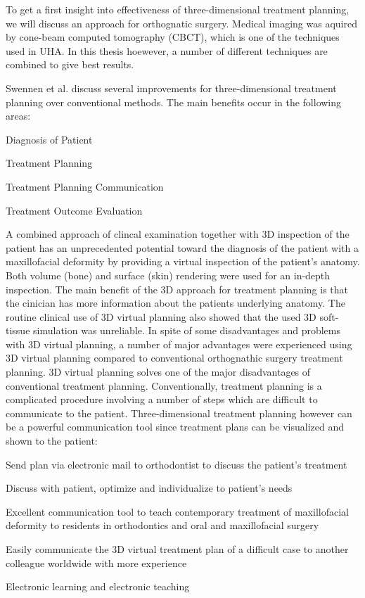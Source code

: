 To get a first insight into effectiveness of three-dimensional treatment planning, we will discuss an approach for orthognatic surgery.
Medical imaging was aquired by cone-beam computed tomography (CBCT), which is one of the techniques used in UHA.
In this thesis hoewever, a number of different techniques are combined to give best results.

Swennen et al. discuss several improvements for three-dimensional treatment planning over conventional methods.
The main benefits occur in the following areas:

\begin{compactenum}[label=(\alph*)]
    \item Diagnosis of Patient
    \item Treatment Planning
    \item Treatment Planning Communication
    \item Treatment Outcome Evaluation
\end{compactenum}

A combined approach of clincal examination together with 3D inspection of the patient has an unprecedented potential toward the diagnosis of the patient with a maxillofacial deformity \cite{swennen2009three} by providing a virtual inspection of the patient’s anatomy.
Both volume (bone) and surface (skin) rendering were used for an in-depth inspection.
The main benefit of the 3D approach for treatment planning is that the cinician has more information about the patients underlying anatomy.
The routine clinical use of 3D virtual planning also showed that the used 3D soft-tissue simulation was unreliable.
In spite of some disadvantages and problems with 3D virtual planning, a number of major advantages were experienced using 3D virtual planning compared to conventional orthognathic surgery treatment planning.
3D virtual planning solves one of the major disadvantages of conventional treatment planning. Conventionally, treatment planning is a complicated procedure involving a number of steps which are difficult to communicate to the patient.
Three-dimensional treatment planning however can be a powerful communication tool since treatment plans can be visualized and shown to the patient:

\begin{compactenum}[label=(\alph*)]
    \item Send plan via electronic mail to orthodontist to discuss the patient’s treatment
    \item Discuss with patient, optimize and individualize to patient's needs
    \item Excellent communication tool to teach contemporary treatment of maxillofacial deformity to residents in orthodontics and oral and maxillofacial surgery
    \item Easily communicate the 3D virtual treatment plan of a difficult case to another colleague worldwide with more experience
    \item Electronic learning and electronic teaching
\end{compactenum}

